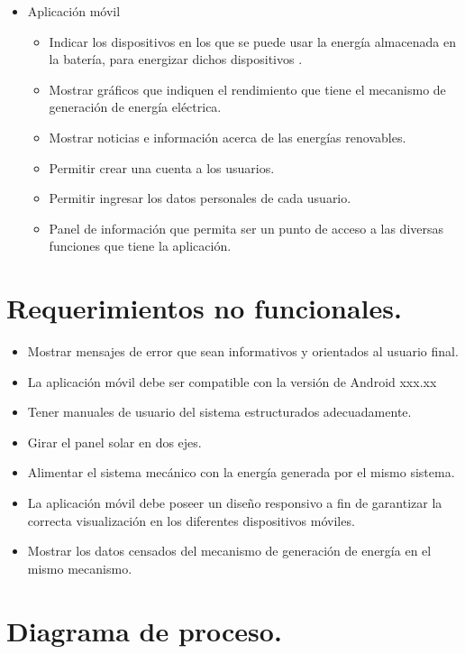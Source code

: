 \begin{itemize}
    \item Aplicación móvil
    \begin{itemize}
     \item Indicar los dispositivos  en los que se puede usar la energía almacenada en la batería, para energizar dichos dispositivos .
     \item Mostrar gráficos que indiquen el rendimiento que  tiene el mecanismo de generación de energía eléctrica.
     \item Mostrar noticias e información acerca de las energías renovables.
     \item Permitir crear una cuenta a los usuarios.
     \item Permitir ingresar los datos personales de cada usuario.
     \item Panel de información que permita ser un punto de acceso a las diversas funciones que tiene la aplicación.
    \end{itemize}
\end{itemize}

\section{Requerimientos no funcionales.}

\begin{itemize}
    \item Mostrar mensajes de error que sean informativos y orientados al usuario final.
    \item La aplicación móvil debe ser compatible con la versión de Android xxx.xx
    \item Tener manuales de usuario del sistema estructurados adecuadamente.
    \item Girar el panel solar en dos ejes.
    \item Alimentar el sistema mecánico con la energía generada por el mismo sistema.
    \item La aplicación móvil debe poseer un diseño responsivo a fin de garantizar la correcta visualización en los diferentes dispositivos móviles.
    \item Mostrar los datos censados del mecanismo de generación de energía en el mismo mecanismo. 
\end{itemize}


\section{Diagrama de proceso.}

